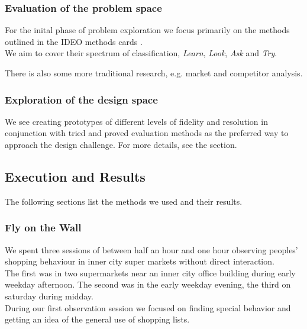 \documentclass{scrartcl}
\begin{document}
    \subsubsection{Evaluation of the problem space}
      For the inital phase of problem exploration we focus primarily on the methods outlined in the IDEO methods cards \cite{TODO}.\\
      We aim to cover their spectrum of classification, \textit{Learn}, \textit{Look}, \textit{Ask} and \textit{Try}.

      There is also some more traditional research, e.g. market and competitor analysis.

    \subsubsection{Exploration of the design space}
      We see creating prototypes of different levels of fidelity and resolution in conjunction with tried and proved evaluation methods as the preferred way to approach the design challenge. 
      For more details, see the  section.

  \subsection{Execution and Results}
    The following sections list the methods we used and their results.

    \subsubsection{Fly on the Wall}
      We spent three sessions of between half an hour and one hour observing peoples' shopping behaviour in inner city super markets without direct interaction.\\
      The first was in two supermarkets near an inner city office building during early weekday afternoon.
      The second was in the early weekday evening, the third on saturday during midday.\\

      During our first observation session we focused on finding special behavior and getting an idea of the general use of shopping lists.\\
\end{document}
